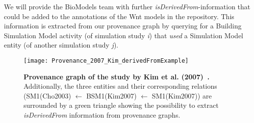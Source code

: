 \documentclass{article}
\newcommand{\SM}{Simulation Model}
\newcommand{\BSM}{Building Simulation Model}
\begin{document}
We will provide the BioModels team with further \textit{isDerivedFrom}-information that could be added to the annotations of the Wnt models in the repository.
This information is extracted from our provenance graph by querying for a \BSM{} activity (of simulation study \textit{i}) that \textit{used} a \SM{} entity (of another simulation study \textit{j}).

\begin{figure}[!h]%
\centering
\texttt{[image: Provenance\_2007\_Kim\_derivedFromExample]}
\caption{{\bf Provenance graph of the study by Kim et al. (2007)~\cite{Kim2007}.}
Additionally, the three entities and their corresponding relations (SM1(Cho2003) $\leftarrow$ BSM1(Kim2007) $\leftarrow$ SM1(Kim2007)) are surrounded by a green triangle showing the possibility to extract \textit{isDerivedFrom} information from provenance graphs.}
\label{fig:KimDerived}
\end{figure}


\end{document}
